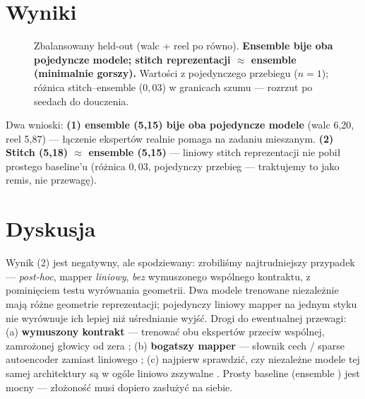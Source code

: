 \documentclass[11pt]{article}
\begin{document}
\section{Wyniki}
\begin{figure}[h]
\centering
{}
\caption{Zbalansowany held-out (walc + reel po równo). \textbf{Ensemble bije oba pojedyncze modele;
stitch reprezentacji $\approx$ ensemble (minimalnie gorszy).} Wartości z pojedynczego przebiegu ($n{=}1$);
różnica stitch--ensemble ($0{,}03$) w granicach szumu --- rozrzut po seedach do douczenia.}
\end{figure}

\noindent Dwa wnioski: \textbf{(1) ensemble (5{,}15) bije oba pojedyncze modele} (walc 6{,}20, reel 5{,}87) ---
łączenie ekspertów realnie pomaga na zadaniu mieszanym. \textbf{(2) Stitch (5{,}18) $\approx$ ensemble (5{,}15)}
--- liniowy stitch reprezentacji nie pobił prostego baseline'u (różnica $0{,}03$, pojedynczy przebieg --- traktujemy to jako remis, nie przewagę).

\section{Dyskusja}
Wynik (2) jest negatywny, ale spodziewany: zrobiliśmy najtrudniejszy przypadek --- \emph{post-hoc}, mapper
\emph{liniowy}, \emph{bez} wymuszonego wspólnego kontraktu, z pominięciem testu wyrównania geometrii. Dwa modele
trenowane niezależnie mają różne geometrie reprezentacji; pojedynczy liniowy mapper na jednym styku nie wyrównuje
ich lepiej niż uśrednianie wyjść. Drogi do ewentualnej przewagi: (a) \textbf{wymuszony kontrakt} --- trenować obu
ekspertów przeciw wspólnej, zamrożonej głowicy od zera \cite{rebasin,zipit}; (b) \textbf{bogatszy mapper} ---
słownik cech / sparse autoencoder zamiast liniowego \cite{vqvae,sae}; (c) najpierw sprawdzić, czy niezależne
modele tej samej architektury są w ogóle liniowo zszywalne \cite{stitch15,bansal21}. Prosty baseline (ensemble
\cite{ensembles}) jest mocny --- złożoność musi dopiero zasłużyć na siebie.
\end{document}
